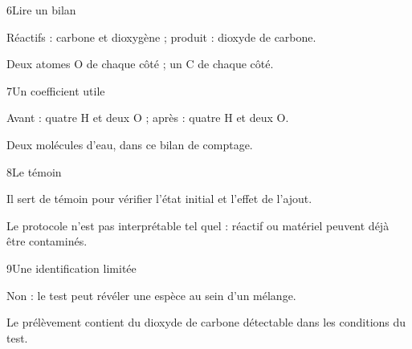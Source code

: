 \par\noindent\begin{minipage}{\linewidth}
\begin{corrige}{6}{Lire un bilan}
\begin{questions}
\item Réactifs : carbone et dioxygène ; produit : dioxyde de carbone.
\item Deux atomes O de chaque côté ; un C de chaque côté.
\end{questions}
\end{corrige}
\end{minipage}
\par\noindent\begin{minipage}{\linewidth}
\begin{corrige}{7}{Un coefficient utile}
\begin{questions}
\item Avant : quatre H et deux O ; après : quatre H et deux O.
\item Deux molécules d’eau, dans ce bilan de comptage.
\end{questions}
\end{corrige}
\end{minipage}
\par\noindent\begin{minipage}{\linewidth}
\begin{corrige}{8}{Le témoin}
\begin{questions}
\item Il sert de témoin pour vérifier l’état initial et l’effet de l’ajout.
\item Le protocole n’est pas interprétable tel quel : réactif ou matériel peuvent déjà être contaminés.
\end{questions}
\end{corrige}
\end{minipage}
\par\noindent\begin{minipage}{\linewidth}
\begin{corrige}{9}{Une identification limitée}
\begin{questions}
\item Non : le test peut révéler une espèce au sein d’un mélange.
\item Le prélèvement contient du dioxyde de carbone détectable dans les conditions du test.
\end{questions}
\end{corrige}
\end{minipage}
